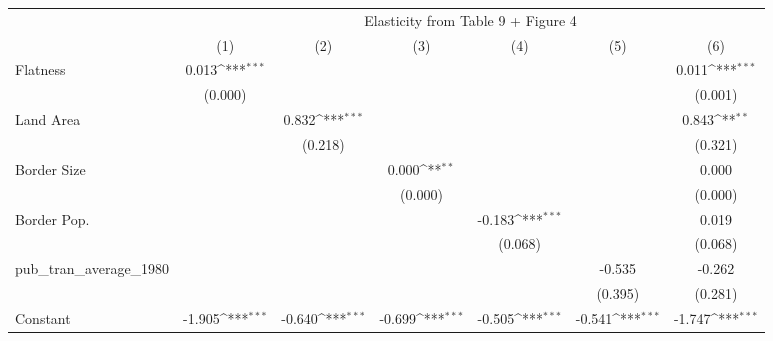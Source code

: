 {
\def\sym#1{\ifmmode^{#1}\else\(^{#1}\)\fi}
\begin{tabular}{l*{6}{c}}
\hline\hline
            &\multicolumn{6}{c}{Elasticity from Table 9 + Figure 4}                                                                             \\
            &\multicolumn{1}{c}{(1)}         &\multicolumn{1}{c}{(2)}         &\multicolumn{1}{c}{(3)}         &\multicolumn{1}{c}{(4)}         &\multicolumn{1}{c}{(5)}         &\multicolumn{1}{c}{(6)}         \\
\hline
Flatness    &       0.013\sym{***}&                     &                     &                     &                     &       0.011\sym{***}\\
            &     (0.000)         &                     &                     &                     &                     &     (0.001)         \\
[1em]
Land Area   &                     &       0.832\sym{***}&                     &                     &                     &       0.843\sym{**} \\
            &                     &     (0.218)         &                     &                     &                     &     (0.321)         \\
[1em]
Border Size &                     &                     &       0.000\sym{**} &                     &                     &       0.000         \\
            &                     &                     &     (0.000)         &                     &                     &     (0.000)         \\
[1em]
Border Pop. &                     &                     &                     &      -0.183\sym{***}&                     &       0.019         \\
            &                     &                     &                     &     (0.068)         &                     &     (0.068)         \\
[1em]
pub\_tran\_average\_1980&                     &                     &                     &                     &      -0.535         &      -0.262         \\
            &                     &                     &                     &                     &     (0.395)         &     (0.281)         \\
[1em]
Constant    &      -1.905\sym{***}&      -0.640\sym{***}&      -0.699\sym{***}&      -0.505\sym{***}&      -0.541\sym{***}&      -1.747\sym{***}\\

\end{tabular}}
